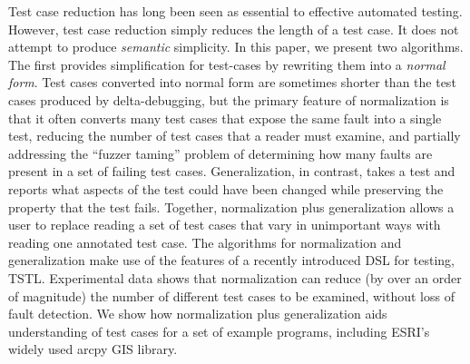 Test case reduction has long been seen as essential to effective automated testing.  However, test case reduction simply reduces the length of a test case.  It does not attempt to produce \emph{semantic} simplicity.  In this paper, we present two algorithms.  The first provides simplification for test-cases by rewriting them into a \emph{normal form}.  Test cases converted into normal form are sometimes shorter than the test cases produced by delta-debugging, but the primary feature of normalization is that it often converts many test cases that expose the same fault into a single test, reducing the number of test cases that a reader must examine, and partially addressing the ``fuzzer taming'' problem of determining how many faults are present in a set of failing test cases.  Generalization, in contrast, takes a test and reports what aspects of the test could have been changed while preserving the property that the test fails.  Together, normalization plus generalization allows a user to replace reading a set of test cases that vary in unimportant ways with reading one annotated test case.  The algorithms for normalization and generalization make use of the features of a recently introduced DSL for testing, TSTL.  Experimental data shows that normalization can reduce (by over an order of magnitude) the number of different test cases to be examined, without loss of fault detection.  We show how normalization plus generalization aids understanding of test cases for a set of example programs, including ESRI's widely used arcpy GIS library.